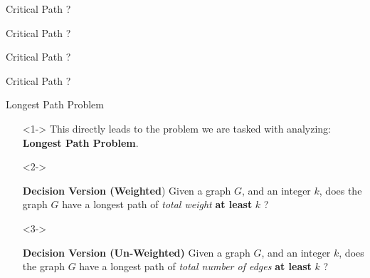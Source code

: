 \begin{frame}{Critical Path ?}

\end{frame}

\begin{frame}{Critical Path ?}

\end{frame}


\begin{frame}{Critical Path ?}

\end{frame}

\begin{frame}{Critical Path ?}

\end{frame}

\begin{frame}{Longest Path Problem}
    \begin{itemize}
        \item[]<1-> This directly leads to the problem we are tasked with analyzing: \textbf{Longest Path Problem}.
        \item[]<2-> 
        \begin{block}{\textbf{Decision Version (Weighted})}
            {Given a graph $G$, and an integer $k$, does the graph $G$ have a longest path of \textit{total weight} \textbf{at least} $k$ ?}
        \end{block}
        
        \item[]<3->
        \begin{block}{\textbf{Decision Version (Un-Weighted)}}
            {Given a graph $G$, and an integer $k$, does the graph $G$ have a longest path of \textit{total number of edges} \textbf{at least} $k$ ?}
        \end{block}
        
    \end{itemize}
    
    
    
    
    
\end{frame}